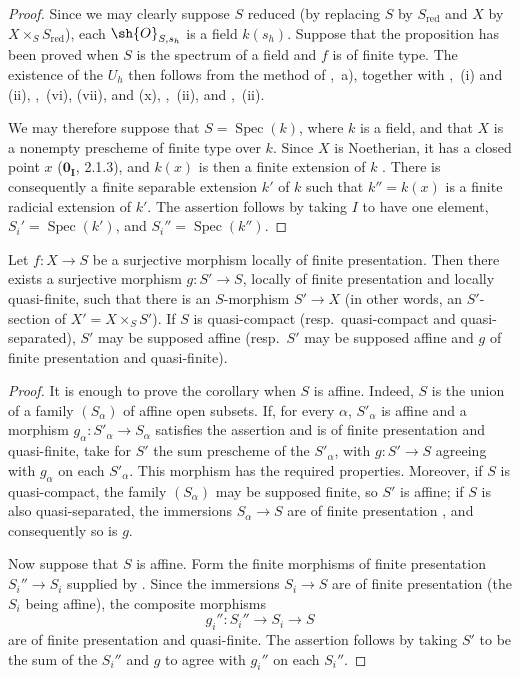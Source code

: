 \begin{proof}
Since we may clearly suppose $S$ reduced (by replacing $S$ by $S_{\mathrm{red}}$ and $X$ by $X\times_SS_{\mathrm{red}}$), each $\sh{O}_{S,s_h}$ is a field $k(s_h)$.  Suppose that the proposition has been proved when $S$ is the spectrum of a field and $f$ is of finite type.  The existence of the $U_h$ then follows from the method of ,~a), together with ,~(i) and (ii), ,~(vi), (vii), and (x), ,~(ii), and ,~(ii).

We may therefore suppose that $S=\operatorname{Spec}(k)$, where $k$ is a field, and that $X$ is a nonempty prescheme of finite type over $k$.  Since $X$ is Noetherian, it has a closed point $x$ ($\mathbf{0}_{\mathbf I}$, 2.1.3), and $k(x)$ is then a finite extension of $k$ .  There is consequently a finite separable extension $k'$ of $k$ such that $k''=k(x)$ is a finite radicial extension of $k'$.  The assertion follows by taking $I$ to have one element, $S_i'=\operatorname{Spec}(k')$, and $S_i''=\operatorname{Spec}(k'')$.
\end{proof}

\begin{corollary}[17.16.5]
\label{IV.17.16.5}
Let $f:X\to S$ be a surjective morphism locally of finite presentation.
Then there exists a surjective morphism $g:S'\to S$, locally of finite presentation and locally quasi-finite, such that there is an $S$-morphism $S'\to X$ (in other words, an $S'$-section of $X'=X\times_S S'$).
If $S$ is quasi-compact (resp.\ quasi-compact and quasi-separated), $S'$ may be supposed affine (resp.\ $S'$ may be supposed affine and $g$ of finite presentation and quasi-finite).
\end{corollary}


\begin{proof}
It is enough to prove the corollary when $S$ is affine.  Indeed, $S$ is the union of a family $(S_\alpha)$ of affine open subsets.  If, for every $\alpha$, $S'_\alpha$ is affine and a morphism $g_\alpha:S'_\alpha\to S_\alpha$ satisfies the assertion and is of finite presentation and quasi-finite, take for $S'$ the sum prescheme of the $S'_\alpha$, with $g:S'\to S$ agreeing with $g_\alpha$ on each $S'_\alpha$.  This morphism has the required properties.  Moreover, if $S$ is quasi-compact, the family $(S_\alpha)$ may be supposed finite, so $S'$ is affine; if $S$ is also quasi-separated, the immersions $S_\alpha\to S$ are of finite presentation , and consequently so is $g$.

Now suppose that $S$ is affine.  Form the finite morphisms of finite presentation $S_i''\to S_i$ supplied by .  Since the immersions $S_i\to S$ are of finite presentation (the $S_i$ being affine), the composite morphisms
\[
 g_i'':S_i''\longrightarrow S_i\longrightarrow S
\]
are of finite presentation and quasi-finite.  The assertion follows by taking $S'$ to be the sum of the $S_i''$ and $g$ to agree with $g_i''$ on each $S_i''$.
\end{proof}

